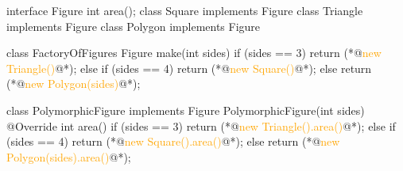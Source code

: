 \documentclass{article}
\begin{document}
\begin{lnSnippet}
interface Figure
  int area();
class Square implements Figure
class Triangle implements Figure
class Polygon implements Figure

class FactoryOfFigures
  Figure make(int sides) {
    if (sides == 3) {
      return (*@\textcolor{orange}{new Triangle()}@*);
    } else if (sides == 4) {
      return (*@\textcolor{orange}{new Square()}@*);
    } else {
      return (*@\textcolor{orange}{new Polygon(sides)}@*);
    }
  }
\end{lnSnippet}
\begin{lnSnippet}
class PolymorphicFigure implements Figure
  PolymorphicFigure(int sides)
  @Override int area() {
    if (sides == 3) {
      return (*@\textcolor{orange}{new Triangle().area()}@*);
    } else if (sides == 4) {
      return (*@\textcolor{orange}{new Square().area()}@*);
    } else {
      return (*@\textcolor{orange}{new Polygon(sides).area()}@*);
    }
  }
\end{lnSnippet}
\end{document}
